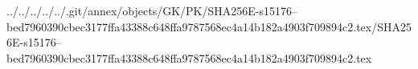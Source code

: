 ../../../../../.git/annex/objects/GK/PK/SHA256E-s15176--bed7960390cbec3177ffa43388c648ffa9787568ec4a14b182a4903f709894c2.tex/SHA256E-s15176--bed7960390cbec3177ffa43388c648ffa9787568ec4a14b182a4903f709894c2.tex